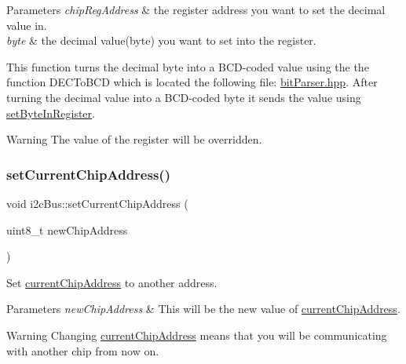 \begin{DoxyParams}{Parameters}
{\em chip\+Reg\+Address} & the register address you want to set the decimal value in. \\
\hline
{\em byte} & the decimal value(byte) you want to set into the register.\\
\hline
\end{DoxyParams}
This function turns the decimal byte into a B\+C\+D-\/coded value using the the function D\+E\+C\+To\+B\+CD which is located the following file\+: \mbox{\hyperlink{bit_parser_8hpp_source}{bit\+Parser.\+hpp}}. After turning the decimal value into a B\+C\+D-\/coded byte it sends the value using \mbox{\hyperlink{classi2c_bus_a8bed9bf37dee74b691ab4c92723dd206}{set\+Byte\+In\+Register}}. \begin{DoxyWarning}{Warning}
The value of the register will be overridden. 
\end{DoxyWarning}
\mbox{\label{classi2c_bus_a5f3a99851f437473a00f1216ba2a1517}} 
\subsubsection{\texorpdfstring{set\+Current\+Chip\+Address()}{setCurrentChipAddress()}}
{\footnotesize\ttfamily void i2c\+Bus\+::set\+Current\+Chip\+Address (\begin{DoxyParamCaption}\item[{uint8\+\_\+t}]{new\+Chip\+Address }\end{DoxyParamCaption})}



Set \mbox{\hyperlink{classi2c_bus_a64ff87527c88619d72ede947d73eac3a}{current\+Chip\+Address}} to another address. 


\begin{DoxyParams}{Parameters}
{\em new\+Chip\+Address} & This will be the new value of \mbox{\hyperlink{classi2c_bus_a64ff87527c88619d72ede947d73eac3a}{current\+Chip\+Address}}. \\
\hline
\end{DoxyParams}
\begin{DoxyWarning}{Warning}
Changing \mbox{\hyperlink{classi2c_bus_a64ff87527c88619d72ede947d73eac3a}{current\+Chip\+Address}} means that you will be communicating with another chip from now on. 
\end{DoxyWarning}
\mbox{\label{classi2c_bus_adee2545c8b692474b6814b4605e48ec3}} 
